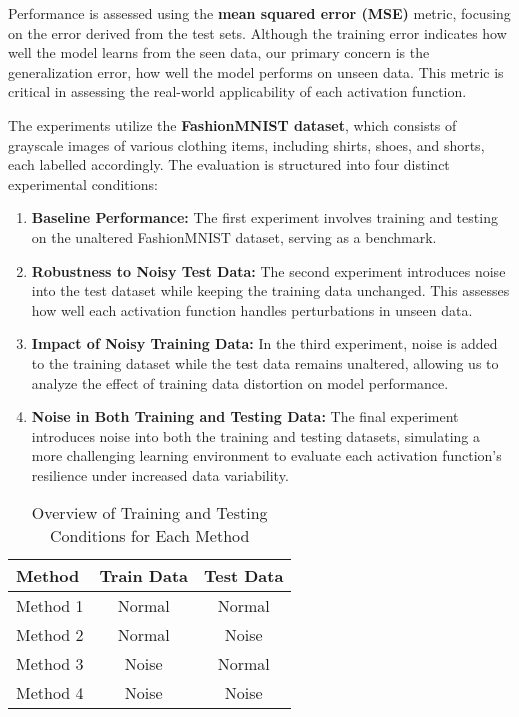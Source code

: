 \documentclass{article}
\begin{document}
Performance is assessed using the \textbf{mean squared error (MSE)} metric, focusing on the error derived from the test sets. Although the training error indicates how well the model learns from the seen data, our primary concern is the generalization error, how well the model performs on unseen data. This metric is critical in assessing the real-world applicability of each activation function.

The experiments utilize the \textbf{FashionMNIST dataset}, which consists of grayscale images of various clothing items, including shirts, shoes, and shorts, each labelled accordingly. The evaluation is structured into four distinct experimental conditions:

\begin{enumerate}
    \item \textbf{Baseline Performance:} The first experiment involves training and testing on the unaltered FashionMNIST dataset, serving as a benchmark.
    \item \textbf{Robustness to Noisy Test Data:} The second experiment introduces noise into the test dataset while keeping the training data unchanged. This assesses how well each activation function handles perturbations in unseen data.
    \item \textbf{Impact of Noisy Training Data:} In the third experiment, noise is added to the training dataset while the test data remains unaltered, allowing us to analyze the effect of training data distortion on model performance.
    \item \textbf{Noise in Both Training and Testing Data:} The final experiment introduces noise into both the training and testing datasets, simulating a more challenging learning environment to evaluate each activation function’s resilience under increased data variability.
\end{enumerate}

\begin{table}[h]
    \centering
    \renewcommand{\arraystretch}{1.3}
    \begin{tabular}{|l|c|c|}
        \hline
        \textbf{Method} & \textbf{Train Data} & \textbf{Test Data} \\
        \hline
        Method 1 & Normal & Normal \\
        Method 2 & Normal & Noise \\
        Method 3 & Noise  & Normal \\
        Method 4 & Noise  & Noise  \\
        \hline
    \end{tabular}
    \caption{Overview of Training and Testing Conditions for Each Method}
    \label{tab:train_test_methods}
\end{table}
\end{document}
